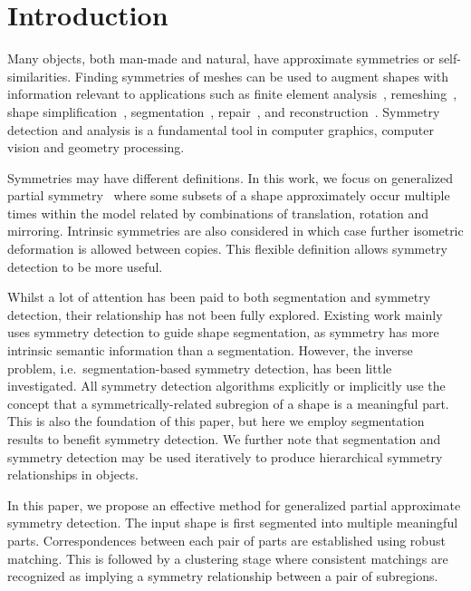 \section{Introduction}
\label{sec:intro}

Many objects, both man-made and natural, have approximate symmetries or self-similarities.
Finding  symmetries of meshes can be used to augment shapes with information relevant to applications such as  finite element analysis~\cite{Gellert1987}, remeshing~\cite{podolak2006}, shape simplification~\cite{pauly2008},
segmentation~\cite{Shamir2008,mitra2006,xu2009},
repair~\cite{bokeloh2009,berner2011}, and reconstruction~\cite{zabrodsky1997}.
Symmetry detection and analysis is a fundamental tool in computer graphics, computer vision and geometry processing.

Symmetries may have different definitions. In this work, we focus on generalized partial symmetry~\cite{mitra2006,berner2011} where some subsets of a shape approximately occur multiple times within the model related by combinations of translation, rotation and mirroring. Intrinsic symmetries are also considered in which case further isometric deformation is allowed between copies. This flexible definition allows symmetry detection to be more useful.

Whilst a lot of attention has been paid to both segmentation and symmetry detection, their relationship has not been fully explored.
Existing work mainly uses  symmetry detection to guide shape segmentation, as symmetry has more intrinsic semantic information than a segmentation.
However, the inverse problem, i.e.\ segmentation-based symmetry detection, has been little investigated.
All symmetry detection algorithms explicitly or implicitly use the concept that a symmetrically-related subregion of a shape is a meaningful part.
This is also the foundation of this paper, but here we employ segmentation results to benefit symmetry detection.
We further note that segmentation and symmetry detection may be used iteratively to produce hierarchical symmetry relationships in objects.

In this paper, we propose an effective method for generalized partial approximate symmetry detection.
The input shape is first segmented into multiple meaningful parts. Correspondences between each pair of parts are established using robust matching.
This is followed by a clustering stage where consistent matchings are recognized as implying a symmetry relationship between a pair of subregions.

